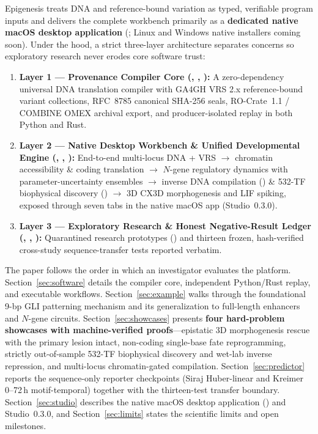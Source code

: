 \documentclass[10.5pt,a4paper]{article}
\begin{document}
Epigenesis treats DNA and reference-bound variation as typed, verifiable program inputs and delivers the complete workbench primarily as a \textbf{dedicated native macOS desktop application} (; Linux and Windows native installers coming soon\texttrademark). Under the hood, a strict three-layer architecture separates concerns so exploratory research never erodes core software trust:
\begin{enumerate}
\item \textbf{Layer 1 — Provenance Compiler Core (, , ):} A zero-dependency universal DNA translation compiler with GA4GH VRS 2.x reference-bound variant collections, RFC~8785 canonical SHA-256 seals, RO-Crate~1.1 / COMBINE OMEX archival export, and producer-isolated replay in both Python and Rust.
\item \textbf{Layer 2 — Native Desktop Workbench \& Unified Developmental Engine (, , ):} End-to-end multi-locus DNA + VRS $\rightarrow$ chromatin accessibility \& coding translation $\rightarrow$ $N$-gene regulatory dynamics with parameter-uncertainty ensembles $\rightarrow$ inverse DNA compilation () \& 532-TF biophysical discovery () $\rightarrow$ 3D CX3D morphogenesis and LIF spiking, exposed through seven tabs in the native macOS app (Studio~0.3.0).
\item \textbf{Layer 3 — Exploratory Research \& Honest Negative-Result Ledger (, , ):} Quarantined research prototypes () and thirteen frozen, hash-verified cross-study sequence-transfer tests reported verbatim.
\end{enumerate}

The paper follows the order in which an investigator evaluates the platform. Section~\ref{sec:software} details the compiler core, independent Python/Rust replay, and executable workflows. Section~\ref{sec:example} walks through the foundational 9-bp GLI patterning mechanism and its generalization to full-length enhancers and $N$-gene circuits. Section~\ref{sec:showcases} presents \textbf{four hard-problem showcases with machine-verified proofs}—epistatic 3D morphogenesis rescue with the primary lesion intact, non-coding single-base fate reprogramming, strictly out-of-sample 532-TF biophysical discovery and wet-lab inverse repression, and multi-locus chromatin-gated compilation. Section~\ref{sec:predictor} reports the sequence-only reporter checkpoints (Siraj Huber-linear and Kreimer 0--72\,h motif-temporal) together with the thirteen-test transfer boundary. Section~\ref{sec:studio} describes the native macOS desktop application () and Studio~0.3.0, and Section~\ref{sec:limits} states the scientific limits and open milestones.
\end{document}
